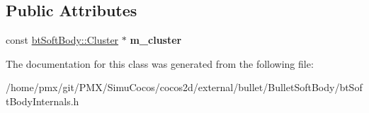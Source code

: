 \subsection*{Public Attributes}
\begin{DoxyCompactItemize}
\item 
\mbox{\label{classbtSoftClusterCollisionShape_a8effbadda0ac7a03655ff3b5631815ac}} 
const \hyperlink{structbtSoftBody_1_1Cluster}{bt\+Soft\+Body\+::\+Cluster} $\ast$ {\bfseries m\+\_\+cluster}
\end{DoxyCompactItemize}


The documentation for this class was generated from the following file\+:\begin{DoxyCompactItemize}
\item 
/home/pmx/git/\+P\+M\+X/\+Simu\+Cocos/cocos2d/external/bullet/\+Bullet\+Soft\+Body/bt\+Soft\+Body\+Internals.\+h\end{DoxyCompactItemize}
